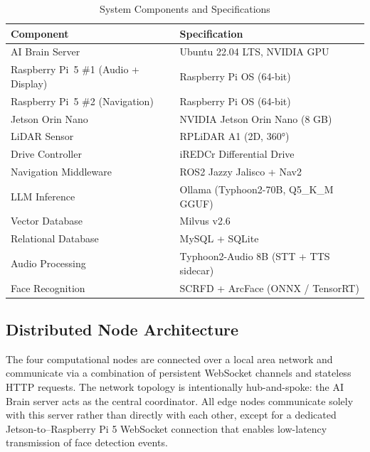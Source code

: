 \begin{table}[h]
\captionsetup{justification=raggedright,singlelinecheck=false,margin=0pt,indention=0pt}
\caption{System Components and Specifications}
\label{tab:system_components}
\noindent
{\fontsize{14pt}{16.8pt}\selectfont
\renewcommand{\arraystretch}{1.35}
\setlength{\tabcolsep}{8pt}
\begin{tabular*}{\textwidth}{@{\extracolsep{\fill}}l|l}
\hline
\textbf{Component} & \textbf{Specification} \\ \hline
AI Brain Server                              & Ubuntu 22.04 LTS, NVIDIA GPU \\ \hline
Raspberry Pi~5 \#1 (Audio + Display)        & Raspberry Pi OS (64-bit) \\ \hline
Raspberry Pi~5 \#2 (Navigation)             & Raspberry Pi OS (64-bit) \\ \hline
Jetson Orin Nano                             & NVIDIA Jetson Orin Nano (8 GB) \\ \hline
LiDAR Sensor                                & RPLiDAR A1 (2D, 360°) \\ \hline
Drive Controller                             & iREDCr Differential Drive \\ \hline
Navigation Middleware                        & ROS2 Jazzy Jalisco + Nav2 \\ \hline
LLM Inference                                & Ollama (Typhoon2-70B, Q5\_K\_M GGUF) \\ \hline
Vector Database                              & Milvus v2.6 \\ \hline
Relational Database                          & MySQL + SQLite \\ \hline
Audio Processing                             & Typhoon2-Audio 8B (STT + TTS sidecar) \\ \hline
Face Recognition                             & SCRFD + ArcFace (ONNX / TensorRT) \\ \hline
\end{tabular*}
}
\end{table}
\noindent


\subsection{Distributed Node Architecture}

The four computational nodes are connected over a local area network and communicate via a combination of persistent WebSocket channels and stateless HTTP requests. The network topology is intentionally hub-and-spoke: the AI Brain server acts as the central coordinator. All edge nodes communicate solely with this server rather than directly with each other, except for a dedicated Jetson-to–Raspberry Pi 5 WebSocket connection that enables low-latency transmission of face detection events.

